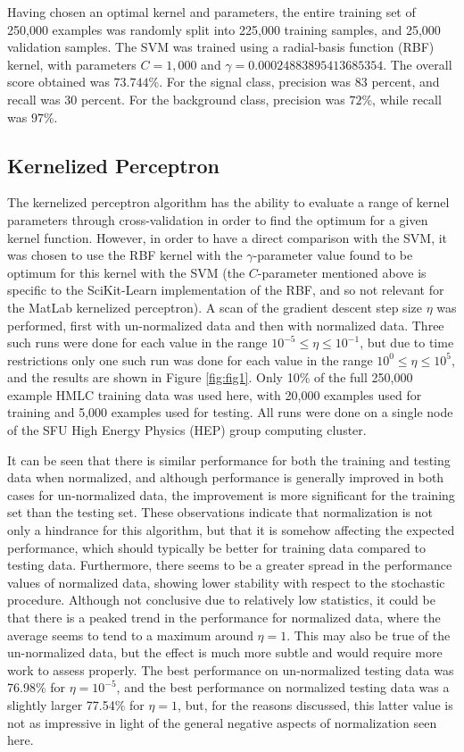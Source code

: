 \documentclass{article} %
\begin{document}
Having chosen an optimal kernel and parameters, the entire training set of 250,000 examples was randomly split into 225,000 training samples, and 25,000 validation samples. The SVM was trained using a radial-basis function (RBF) kernel, with parameters $C=1,000$ and $\gamma=0.00024883895413685354$. The overall score obtained was $73.744$\%. For the signal class, precision was $83$ percent, and recall was $30$ percent. For the background class, precision was $72$\%, while recall was $97$\%.

\subsection{Kernelized Perceptron}
\label{kernelized_perceptron}
The kernelized perceptron algorithm has the ability to evaluate a range of kernel parameters through cross-validation in order to find the optimum for a given kernel function. However, in order to have a direct comparison with the SVM, it was chosen to use the RBF kernel with the $\gamma$-parameter value found to be optimum for this kernel with the SVM (the $C$-parameter mentioned above is specific to the SciKit-Learn implementation of the RBF, and so not relevant for the MatLab kernelized perceptron). A scan of the gradient descent step size $\eta$ was performed, first with un-normalized data and then with normalized data. Three such runs were done for each value in the range $10^{-5}\le\eta\le10^{-1}$, but due to time restrictions only one such run was done for each value in the range $10^{0}\le\eta\le10^{5}$, and the results are shown in Figure \ref{fig:fig1}. Only 10\% of the full 250,000 example HMLC training data was used here, with 20,000 examples used for training and 5,000 examples used for testing. All runs were done on a single node of the SFU High Energy Physics (HEP) group computing cluster.

It can be seen that there is similar performance for both the training and testing data when normalized, and although performance is generally improved in both cases for un-normalized data, the improvement is more significant for the training set than the testing set. These observations indicate that normalization is not only a hindrance for this algorithm, but that it is somehow affecting the expected performance, which should typically be better for training data compared to testing data. Furthermore, there seems to be a greater spread in the performance values of normalized data, showing lower stability with respect to the stochastic procedure. Although not conclusive due to relatively low statistics, it could be that there is a peaked trend in the performance for normalized data, where the average seems to tend to a maximum around $\eta=1$. This may also be true of the un-normalized data, but the effect is much more subtle and would require more work to assess properly. The best performance on un-normalized testing data was 76.98\% for $\eta=10^{-5}$, and the best performance on normalized testing data was a slightly larger 77.54\% for $\eta=1$, but, for the reasons discussed, this latter value is not as impressive in light of the general negative aspects of normalization seen here.
\end{document}
